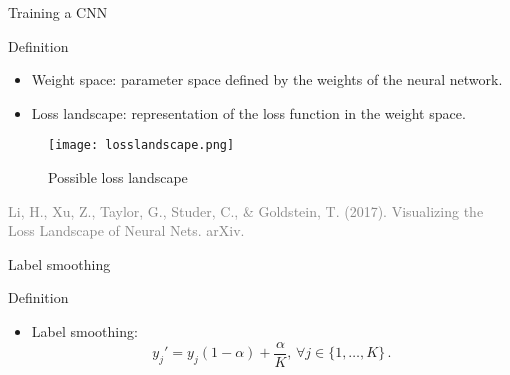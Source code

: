 \begin{frame}{Training a CNN}
    \begin{definitionblock}{Definition}
        \begin{itemize}
            \item <1-> Weight space: parameter space defined by the weights of the neural network.
            \item <2-> Loss landscape: representation of the loss function in the weight space.
        \end{itemize}
    \end{definitionblock}
    \begin{figure}
        \texttt{[image: losslandscape.png]}
        \caption*{Possible loss landscape}
    \end{figure}
    \begin{flushright}
        \tiny{\textcolor{gray}{Li, H., Xu, Z., Taylor, G., Studer, C., \& Goldstein, T. (2017). Visualizing the Loss Landscape of Neural Nets. arXiv.}}
      \end{flushright}
\end{frame}

\begin{frame}{Label smoothing}
    \begin{definitionblock}{Definition}
        \begin{itemize}
            \item Label smoothing:
            \[
                y_j' = y_j(1 - \alpha) + \frac{\alpha}{K},\, \forall j \in \{1, \dots, K\} \,.
            \]
        \end{itemize}
    \end{definitionblock}
\end{frame}

